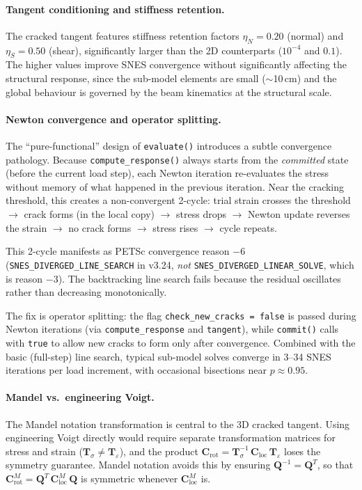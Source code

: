\paragraph{Tangent conditioning and stiffness retention.}
The cracked tangent features stiffness retention factors
$\eta_N = 0.20$ (normal) and $\eta_S = 0.50$ (shear), significantly
larger than the 2D counterparts ($10^{-4}$ and $0.1$).  The higher
values improve SNES convergence without significantly affecting the
structural response, since the sub-model elements are small ($\sim$10\,cm)
and the global behaviour is governed by the beam kinematics at the
structural scale.

\paragraph{Newton convergence and operator splitting.}
The ``pure-functional'' design of \texttt{evaluate()} introduces a subtle
convergence pathology.  Because \texttt{compute\_response()} always starts
from the \emph{committed} state (before the current load step), each
Newton iteration re-evaluates the stress without memory of what happened
in the previous iteration.  Near the cracking threshold, this creates a
non-convergent 2-cycle: trial strain crosses the threshold $\to$ crack
forms (in the local copy) $\to$ stress drops $\to$ Newton update reverses
the strain $\to$ no crack forms $\to$ stress rises $\to$ cycle repeats.

This 2-cycle manifests as PETSc convergence reason $-6$
(\texttt{SNES\_DIVERGED\_LINE\_SEARCH} in v3.24, \emph{not}
\texttt{SNES\_DIVERGED\_LINEAR\_SOLVE}, which is reason $-3$).  The
backtracking line search fails because the residual oscillates rather
than decreasing monotonically.

The fix is operator splitting: the flag
\texttt{check\_new\_cracks\,=\,false} is passed during Newton iterations
(via \texttt{compute\_response} and \texttt{tangent}), while
\texttt{commit()} calls with \texttt{true} to allow new cracks to form
only after convergence.  Combined with the basic (full-step) line search,
typical sub-model solves converge in 3--34 SNES iterations per load
increment, with occasional bisections near $p \approx 0.95$.

\paragraph{Mandel vs.\ engineering Voigt.}
The Mandel notation transformation is central to the 3D cracked tangent.
Using engineering Voigt directly would require separate transformation
matrices for stress and strain ($\mathbf{T}_\sigma \neq \mathbf{T}_\varepsilon$),
and the product
$\mathbf{C}_{\text{rot}} = \mathbf{T}_\sigma^{-1}\,\mathbf{C}_{\text{loc}}\,\mathbf{T}_\varepsilon$
loses the symmetry guarantee.  Mandel notation avoids this by ensuring
$\mathbf{Q}^{-1} = \mathbf{Q}^T$, so that
$\mathbf{C}^M_{\text{rot}} = \mathbf{Q}^T\,\mathbf{C}^M_{\text{loc}}\,\mathbf{Q}$
is symmetric whenever $\mathbf{C}^M_{\text{loc}}$ is.
